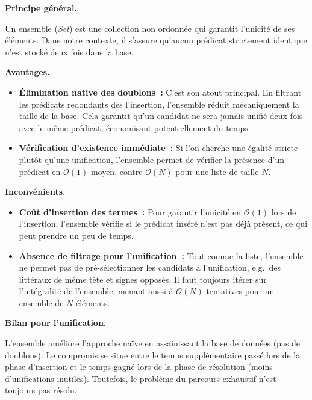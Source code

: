 \documentclass[11pt]{article}
\newenvironment{paraph}[1]{%
  \medskip
  \noindent\textbf{#1.}\quad

  \vspace{0.2cm}
}{%
  \medskip
}
\begin{document}
\begin{paraph}{Principe général}
    Un ensemble (\textit{Set}) est une collection non ordonnée 
    qui garantit l'unicité de ses éléments. Dans notre contexte, 
    il s'assure qu'aucun prédicat strictement identique n'est stocké 
    deux fois dans la base.
\end{paraph}

\newpage
\begin{paraph}{Avantages}
    \begin{itemize}
        \item \textbf{Élimination native des doublons~:} C'est son 
        atout principal. En filtrant les prédicats redondants dès 
        l'insertion, l'ensemble réduit mécaniquement la taille 
        de la base. Cela garantit qu'un candidat ne sera jamais 
        unifié deux fois avec le même prédicat, économisant potentiellement 
        du temps.
        \item \textbf{Vérification d'existence immédiate~:} Si l'on 
        cherche une égalité stricte plutôt qu'une unification, l'ensemble permet de vérifier 
        la présence d'un prédicat en $\mathcal{O}(1)$ moyen, contre $\mathcal{O}(N)$ pour une 
        liste de taille $N$.
    \end{itemize}
\end{paraph}

\begin{paraph}{Inconvénients}
    \begin{itemize}
        \item \textbf{Coût d'insertion des termes~:} Pour garantir 
        l'unicité en $\mathcal{O}(1)$ lors de l'insertion, l'ensemble vérifie 
        si le prédicat inséré n'est pas déjà présent, ce qui peut 
        prendre un peu de temps.
        \item \textbf{Absence de filtrage pour l'unification~:} Tout 
        comme la liste, l'ensemble ne permet pas de pré-sélectionner 
        les candidats à l'unification, e.g.~des littéraux de même tête et signes opposés. Il faut toujours itérer sur 
        l'intégralité de l'ensemble, menant aussi à $\mathcal{O}(N)$ tentatives pour un ensemble de $N$ éléments.
    \end{itemize}
\end{paraph}

\begin{paraph}{Bilan pour l'unification}
    L'ensemble améliore l'approche naïve en assainissant la 
    base de données (pas de doublons). Le compromis se situe 
    entre le temps supplémentaire passé lors de la phase d'insertion 
    et le temps gagné lors de la phase de résolution (moins 
    d'unifications inutiles). Toutefois, le problème du parcours 
    exhaustif n'est toujours pas résolu.
\end{paraph}
\end{document}
